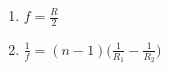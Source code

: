 

\vspace*{\fill}
\centering

\begin{enumerate}
    \item $\displaystyle f = \frac{R}{2}$ 
    \item $\displaystyle \frac{1}{f} = (n-1)\Big( \frac{1}{R_1} - \frac{1}{R_2} \Big)$
\end{enumerate}

\centering
\vspace*{\fill}

